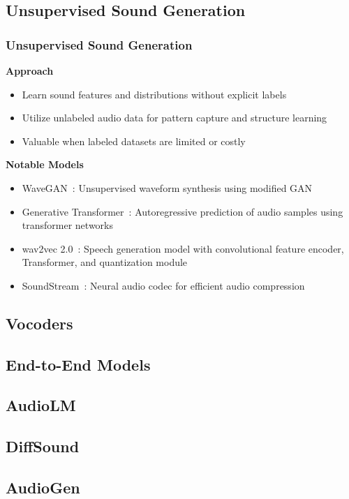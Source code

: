 \subsection{Unsupervised Sound Generation}

\begin{frame}
    \frametitle{Unsupervised Sound Generation}
    
    \textbf{Approach}
    \begin{itemize}
        \item Learn sound features and distributions without explicit labels
        \item Utilize unlabeled audio data for pattern capture and structure learning
        \item Valuable when labeled datasets are limited or costly
    \end{itemize}

    \textbf{Notable Models}
    \begin{itemize}
        \item WaveGAN~\cite{donahue_adversarial_2019}: Unsupervised waveform synthesis using modified GAN
        \item Generative Transformer~\cite{verma_generative_2021}: Autoregressive prediction of audio samples using transformer networks
        \item wav2vec 2.0~\cite{baevski_wav2vec_2020}: Speech generation model with convolutional feature encoder, Transformer, and quantization module
        \item SoundStream~\cite{zeghidour_soundstream_2021}: Neural audio codec for efficient audio compression
    \end{itemize}
\end{frame}


\subsection{Vocoders}

\subsection{End-to-End Models}

\subsection{AudioLM}
\subsection{DiffSound}
\subsection{AudioGen}